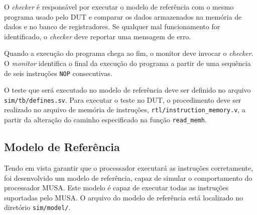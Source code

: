 \documentclass{article}
\begin{document}
  O \textit{checker} é responsável por executar o modelo de referência com o mesmo programa usado pelo DUT e comparar os dados armazenados na memória de dados e no banco de registradores. Se qualquer mal funcionamento for identificado, o \textit{checker} deve reportar uma mensagem de erro.

  Quando a execução do programa chega ao fim, o monitor deve invocar o \textit{checker}. O \textit{monitor} identifica o final da execução do programa a partir de uma sequência de seis instruções \texttt{NOP} consecutivas.

	O teste que será executado no modelo de referência deve ser definido no arquivo \texttt{sim/tb/defines.sv}. Para executar o teste no DUT, o procedimento deve ser realizado no arquivo de memória de instruções, \texttt{rtl/instruction\_memory.v}, a partir da alteração do caminho especificado na fun\c{c}ão \texttt{read\_memh}.

	\subsection{Modelo de Referência}
  Tendo em vista garantir que o processador executará as instruções corretamente, foi desenvolvido um modelo de referência, capaz de simular o comportamento do processador MUSA. Este modelo é capaz de executar todas as instruções suportadas pelo MUSA. O arquivo do modelo de referência está localizado no diretório \texttt{sim/model/}.
	
\end{document}
